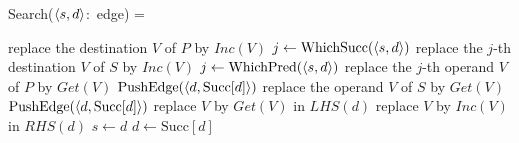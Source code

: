 Search($\left\langle s,d \right\rangle$:~edge) =
\begin{myalgorithmic}
   \STATE replace the destination $V$ of $P$ by $Inc(V)$
  \ENDFOR
   \STATE $j \gets \text{WhichSucc}(\left\langle s,d \right\rangle)$
   \STATE replace the $j$-th destination $V$ of $S$ by $Inc(V)$
  \ENDFOR
 \ENDIF
 \STATE{}
 \LOOP
    \STATE $j\gets \text{WhichPred}(\left\langle s,d \right\rangle)$
    \STATE replace the $j$-th operand $V$ of $P$ by $Get(V)$
   \ENDFOR
   \STATE $\text{PushEdge}(\left\langle d,\text{Succ}[d] \right\rangle)$
   \RETURN
    \STATE replace the operand $V$ of $S$ by $Get(V)$
   \ENDFOR
   \STATE $\text{PushEdge}(\left\langle d,\text{Succ}[d] \right\rangle)$
   \RETURN
  \ENDIF
  \STATE{}
   \STATE replace $V$ by $Get(V)$ in $LHS(d)$
  \ENDFOR
   \STATE replace $V$ by $Inc(V)$ in $RHS(d)$
  \ENDFOR
   \STATE $s \gets d$
   \STATE $d \gets \text{Succ}[d]$
  \ELSE
   \RETURN
  \ENDIF
 \ENDLOOP
\end{myalgorithmic}
